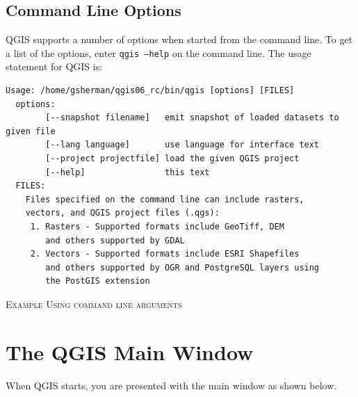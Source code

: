 \subsection{Command Line Options}
QGIS supports a number of options when started from the command line. To get a
list of the options, enter \texttt{qgis ---help} on the command line. The usage
statement for QGIS is:
\small
\begin{verbatim}
Usage: /home/gsherman/qgis06_rc/bin/qgis [options] [FILES]
  options:
        [--snapshot filename]   emit snapshot of loaded datasets to given file
        [--lang language]       use language for interface text
        [--project projectfile] load the given QGIS project
        [--help]                this text
  FILES:
    Files specified on the command line can include rasters,
    vectors, and QGIS project files (.qgs):
     1. Rasters - Supported formats include GeoTiff, DEM
        and others supported by GDAL
     2. Vectors - Supported formats include ESRI Shapefiles
        and others supported by OGR and PostgreSQL layers using
        the PostGIS extension

\end{verbatim}
\normalsize
\begin{Tip} \caption{\textsc{Example Using command line arguments}}
\end{Tip}

\section{The QGIS Main Window}
When QGIS starts, you are presented with the main window as shown below.

